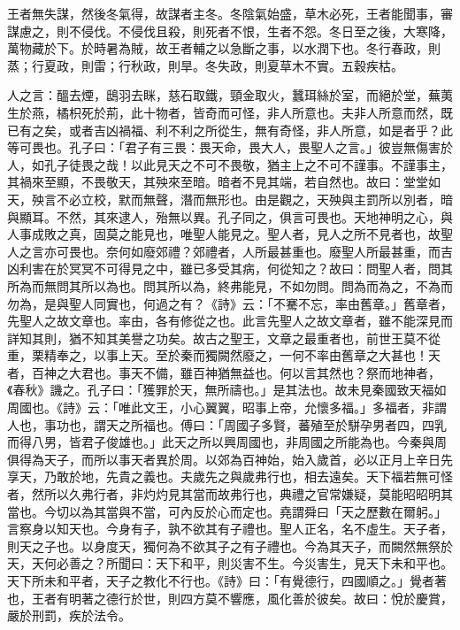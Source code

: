 王者無失謀，然後冬氣得，故謀者主冬。冬陰氣始盛，草木必死，王者能聞事，審謀慮之，則不侵伐。不侵伐且殺，則死者不恨，生者不怨。冬日至之後，大寒降，萬物藏於下。於時暑為賊，故王者輔之以急斷之事，以水潤下也。冬行春政，則蒸；行夏政，則雷；行秋政，則旱。冬失政，則夏草木不實。五穀疾枯。





人之言：醞去煙，鴟羽去眯，慈石取鐵，頸金取火，蠶珥絲於室，而絕於堂，蕪荑生於燕，橘枳死於荊，此十物者，皆奇而可怪，非人所意也。夫非人所意而然，既已有之矣，或者吉凶禍福、利不利之所從生，無有奇怪，非人所意，如是者乎？此等可畏也。孔子曰：「君子有三畏：畏天命，畏大人，畏聖人之言。」彼豈無傷害於人，如孔子徒畏之哉！以此見天之不可不畏敬，猶主上之不可不謹事。不謹事主，其禍來至顯，不畏敬天，其殃來至暗。暗者不見其端，若自然也。故曰：堂堂如天，殃言不必立校，默而無聲，潛而無形也。由是觀之，天殃與主罰所以別者，暗與顯耳。不然，其來逮人，殆無以異。孔子同之，俱言可畏也。天地神明之心，與人事成敗之真，固莫之能見也，唯聖人能見之。聖人者，見人之所不見者也，故聖人之言亦可畏也。奈何如廢郊禮？郊禮者，人所最甚重也。廢聖人所最甚重，而吉凶利害在於冥冥不可得見之中，雖已多受其病，何從知之？故曰：問聖人者，問其所為而無問其所以為也。問其所以為，終弗能見，不如勿問。問為而為之，不為而勿為，是與聖人同實也，何過之有？《詩》云：「不騫不忘，率由舊章。」舊章者，先聖人之故文章也。率由，各有修從之也。此言先聖人之故文章者，雖不能深見而詳知其則，猶不知其美譽之功矣。故古之聖王，文章之最重者也，前世王莫不從重，栗精奉之，以事上天。至於秦而獨闕然廢之，一何不率由舊章之大甚也！天者，百神之大君也。事天不備，雖百神猶無益也。何以言其然也？祭而地神者，《春秋》譏之。孔子曰：「獲罪於天，無所禱也。」是其法也。故未見秦國致天福如周國也。《詩》云：「唯此文王，小心翼翼，昭事上帝，允懷多福。」多福者，非謂人也，事功也，謂天之所福也。傅曰：「周國子多賢，蕃殖至於駢孕男者四，四乳而得八男，皆君子俊雄也。」此天之所以興周國也，非周國之所能為也。今秦與周俱得為天子，而所以事天者異於周。以郊為百神始，始入歲首，必以正月上辛日先享天，乃敢於地，先貴之義也。夫歲先之與歲弗行也，相去遠矣。天下福若無可怪者，然所以久弗行者，非灼灼見其當而故弗行也，典禮之官常嫌疑，莫能昭昭明其當也。今切以為其當與不當，可內反於心而定也。堯謂舜曰「天之歷數在爾躬。」言察身以知天也。今身有子，孰不欲其有子禮也。聖人正名，名不虛生。天子者，則天之子也。以身度天，獨何為不欲其子之有子禮也。今為其天子，而闕然無祭於天，天何必善之？所聞曰：天下和平，則災害不生。今災害生，見天下未和平也。天下所未和平者，天子之教化不行也。《詩》曰：「有覺德行，四國順之。」覺者著也，王者有明著之德行於世，則四方莫不響應，風化善於彼矣。故曰：悅於慶賞，嚴於刑罰，疾於法令。

